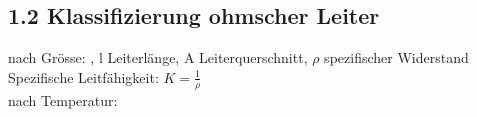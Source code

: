 \subsection*{1.2 Klassifizierung ohmscher Leiter}
nach Grösse:
, l Leiterlänge, A Leiterquerschnitt, $\rho$ spezifischer Widerstand
Spezifische Leitfähigkeit: $ K = \frac{1}{\rho}$\\
nach Temperatur:
